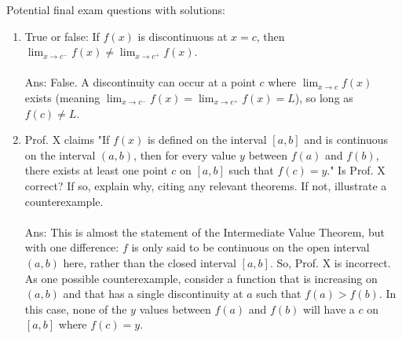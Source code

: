 \documentclass[11pt]{article}
\begin{document}
\thispagestyle{empty}
\begin{center}
Potential final exam questions with solutions:
\end{center}

\begin{enumerate}
\item True or false: If $f(x)$ is discontinuous at $x=c$, then\\
 $\displaystyle\lim_{x\to c^-}f(x)\neq\lim_{x\to c^+}f(x)$.\\
 ~\\
 Ans:  False.  A discontinuity can occur at a point $c$ where $\displaystyle\lim_{x\to c}f(x)$ exists (meaning $\displaystyle\lim_{x\to c^-}f(x)=\lim_{x\to c^+}f(x)=L$), so long as $f(c)\neq L$.

\item Prof. X claims "If $f(x)$ is defined on the interval $[a,b]$ and is continuous on the interval $(a,b)$, then for every value $y$ between $f(a)$ and $f(b)$, there exists at least one point $c$ on $[a,b]$ such that $f(c)=y$."  Is Prof. X correct?  If so, explain why, citing any relevant theorems.  If not, illustrate a counterexample.\\
~\\
Ans: This is almost the statement of the Intermediate Value Theorem, but with one difference: $f$ is only said to be continuous on the open interval $(a,b)$ here, rather than the closed interval $[a,b]$.  So, Prof. X is incorrect. As one possible counterexample, consider a function that is increasing on $(a,b)$ and that has a single discontinuity at $a$ such that $f(a)>f(b)$.  In this case, none of the $y$ values between $f(a)$ and $f(b)$ will have a $c$ on $[a,b]$ where $f(c)=y$.


\end{enumerate}
\end{document}
